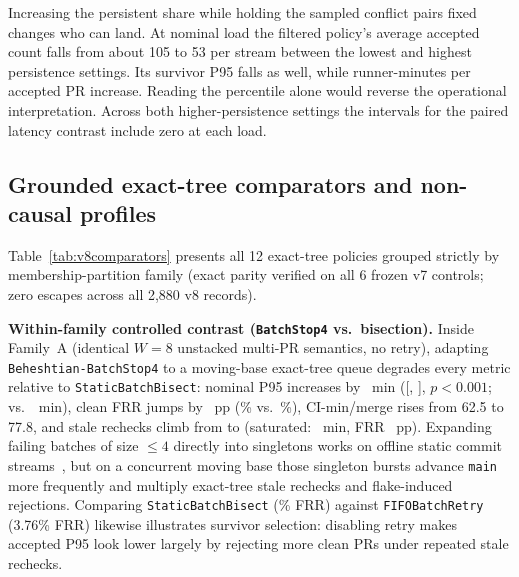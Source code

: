 Increasing the persistent share while holding the sampled conflict pairs fixed changes who can land. At nominal load the filtered policy's average accepted count falls from about 105 to 53 per stream between the lowest and highest persistence settings. Its survivor P95 falls as well, while runner-minutes per accepted PR increase. Reading the percentile alone would reverse the operational interpretation. Across both higher-persistence settings the intervals for the paired latency contrast include zero at each load.

\subsection{Grounded exact-tree comparators and non-causal profiles}
Table~\ref{tab:v8comparators} presents all 12 exact-tree policies grouped strictly by membership-partition family (exact parity verified on all 6 frozen v7 controls; zero escapes across all 2,880 v8 records).

\textbf{Within-family controlled contrast (\texttt{BatchStop4} vs.\ bisection).} Inside Family~A (identical $W{=}8$ unstacked multi-PR semantics, no retry), adapting \texttt{Beheshtian-BatchStop4} to a moving-base exact-tree queue degrades every metric relative to \texttt{StaticBatchBisect}: nominal P95 increases by \BsNomDeltaP{}~min ([\BsNomDeltaPLo{}, \BsNomDeltaPHi{}], $p{<}0.001$; \BsNomP{} vs.\ \NomFifoP{}~min), clean FRR jumps by \BsNomDeltaFrr{}~pp (\BsNomFrr{}\% vs.\ \NomFifoFrr{}\%), CI-min/merge rises from 62.5 to 77.8, and stale rechecks climb from \StaticNomStale{} to \BsNomStale{} (saturated: \BsSatDeltaP{}~min, FRR \BsSatDeltaFrr{}~pp). Expanding failing batches of size $\le 4$ directly into singletons works on offline static commit streams~\cite{beheshtian2022software}, but on a concurrent moving base those singleton bursts advance \texttt{main} more frequently and multiply exact-tree stale rechecks and flake-induced rejections. Comparing \texttt{StaticBatchBisect} (\NomFifoFrr{}\% FRR) against \texttt{FIFOBatchRetry} (3.76\% FRR) likewise illustrates survivor selection: disabling retry makes accepted P95 look lower largely by rejecting more clean PRs under repeated stale rechecks.


